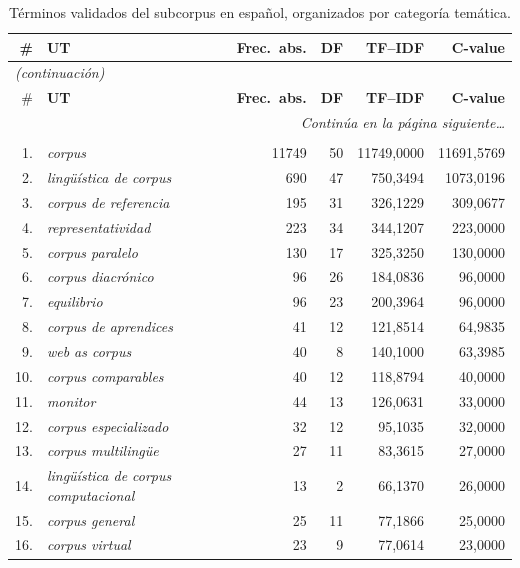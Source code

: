\small
\begin{longtable}{@{} r p{5cm} r r r r @{}}
\toprule
\# & \textbf{UT} & \textbf{Frec.\ abs.} & \textbf{DF} & \textbf{TF--IDF} & \textbf{C-value} \\
\midrule
\endfirsthead
\multicolumn{6}{l}{\small\itshape (continuación)} \\
\toprule
\# & \textbf{UT} & \textbf{Frec.\ abs.} & \textbf{DF} & \textbf{TF--IDF} & \textbf{C-value} \\
\midrule
\endhead
\midrule
\multicolumn{6}{r}{\small\itshape Continúa en la página siguiente\ldots} \\
\endfoot
\bottomrule
\caption{Términos validados del subcorpus en español, organizados por
         categoría temática.}
\label{tab:terminos_es}
\endlastfoot
\multicolumn{6}{l}{\textbf{Metodología y diseño (\textsc{met-di})}} \\
\midrule
1. & \textit{corpus} & 11749 & 50 & 11749{,}0000 & 11691{,}5769 \\
2. & \textit{lingüística de corpus} & 690 & 47 & 750{,}3494 & 1073{,}0196 \\
3. & \textit{corpus de referencia} & 195 & 31 & 326{,}1229 & 309{,}0677 \\
4. & \textit{representatividad} & 223 & 34 & 344{,}1207 & 223{,}0000 \\
5. & \textit{corpus paralelo} & 130 & 17 & 325{,}3250 & 130{,}0000 \\
6. & \textit{corpus diacrónico} & 96 & 26 & 184{,}0836 & 96{,}0000 \\
7. & \textit{equilibrio} & 96 & 23 & 200{,}3964 & 96{,}0000 \\
8. & \textit{corpus de aprendices} & 41 & 12 & 121{,}8514 & 64{,}9835 \\
9. & \textit{web as corpus} & 40 & 8 & 140{,}1000 & 63{,}3985 \\
10. & \textit{corpus comparables} & 40 & 12 & 118{,}8794 & 40{,}0000 \\
11. & \textit{monitor} & 44 & 13 & 126{,}0631 & 33{,}0000 \\
12. & \textit{corpus especializado} & 32 & 12 & 95{,}1035 & 32{,}0000 \\
13. & \textit{corpus multilingüe} & 27 & 11 & 83{,}3615 & 27{,}0000 \\
14. & \textit{lingüística de corpus computacional} & 13 & 2 & 66{,}1370 & 26{,}0000 \\
15. & \textit{corpus general} & 25 & 11 & 77{,}1866 & 25{,}0000 \\
16. & \textit{corpus virtual} & 23 & 9 & 77{,}0614 & 23{,}0000 \\

\end{longtable}
